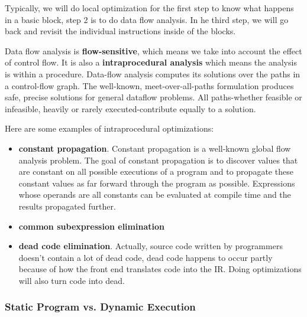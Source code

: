 Typically, we will do local optimization for the first step to know what happens in a 
basic block, step 2 is to do data flow analysis. In he third step, we will go back and 
revisit the individual instructions inside of the blocks.


Data flow analysis is \textbf{flow-sensitive}, which means we take into account
 the effect of control flow. It is also a \textbf{intraprocedural analysis} which means
 the analysis is within a procedure. Data-flow analysis computes its solutions over the paths in
 a control-flow graph. The well-known, meet-over-all-paths
 formulation produces safe, precise solutions for general dataflow problems. All paths-whether feasible or infeasible,
 heavily or rarely executed-contribute equally to a solution. 

Here are some examples of intraprocedural optimizations:

\begin{itemize}
\item \textbf{constant propagation}. Constant propagation is a well-known global flow analysis 
problem. The goal of constant propagation is to discover values that are constant on all possible 
executions of a program and to propagate these constant values as far forward through the program 
as possible. Expressions whose operands are all constants can be evaluated at compile time and the 
results propagated further.

\item \textbf{common subexpression elimination}

\item \textbf{dead code elimination}. Actually, source code written by programmers doesn't contain
 a lot of dead code, dead code happens to occur partly because of how the front end translates code into 
 the IR. Doing optimizations will also turn code into dead.

\end{itemize}






\subsubsection{Static Program vs. Dynamic Execution}


